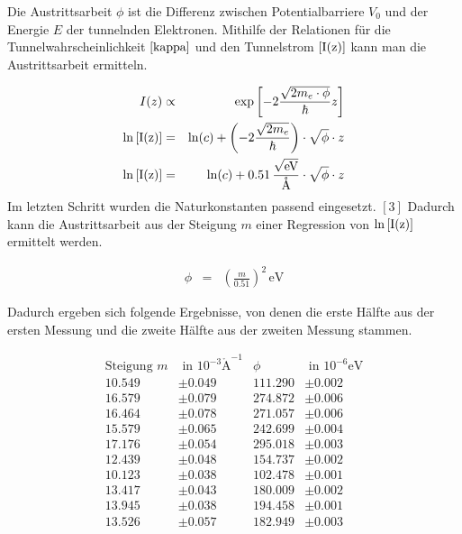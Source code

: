\documentclass[12pt,a4paper]{scrartcl}
\numberwithin{equation}{section} %
\renewcommand{\[}{} %
\renewcommand{\]}{\noindent} %
\begin{document}
Die Austrittsarbeit \(\phi\) ist die Differenz zwischen
Potentialbarriere \(V_0\) und der Energie \(E\) der tunnelnden
Elektronen. Mithilfe der Relationen für die Tunnelwahrscheinlichkeit
\(\eqref{kappa}\) und den Tunnelstrom \(\eqref{I(z)}\) kann man die
Austrittsarbeit ermitteln.

\[
\begin{eqnarray}
    I(z) &\propto& \exp\left[-2\frac{\sqrt{2m_e\cdot \phi}}{\hbar} z\right] \\
    \ln\eqref{I(z)}
        &=& \ln(c)
            + \left(-2\frac{\sqrt{2m_e}}{\hbar}\right)
            \cdot \sqrt{\phi} \cdot z \\
    \ln\eqref{I(z)} &=& \ln(c) + 0.51 \mathrm{\,\frac{\sqrt{eV}}{\mathrm{\mathring{A}}}}\cdot \sqrt{\phi} \cdot z
\end{eqnarray}
\] Im letzten Schritt wurden die Naturkonstanten passend eingesetzt.
\([3]\) Dadurch kann die Austrittsarbeit aus der Steigung \(m\) einer
Regression von \(\ln\eqref{I(z)}\) ermittelt werden.

\[
\begin{eqnarray}
    \phi &=& \left(\frac{m}{0.51}\right)^2 \mathrm{\,eV}
\end{eqnarray}
\]

Dadurch ergeben sich folgende Ergebnisse, von denen die erste Hälfte aus
der ersten Messung und die zweite Hälfte aus der zweiten Messung
stammen.

\[
\begin{align*}
    \text{Steigung } m &\text{ in } 10^{-3}\mathrm{\mathring A}^{-1}
        & \phi &\text{ in } 10^{-6}\mathrm{eV} \\
    10.549 &\pm 0.049 & 111.290 &\pm 0.002 \\
    16.579 &\pm 0.079 & 274.872 &\pm 0.006 \\
    16.464 &\pm 0.078 & 271.057 &\pm 0.006 \\
    15.579 &\pm 0.065 & 242.699 &\pm 0.004 \\
    17.176 &\pm 0.054 & 295.018 &\pm 0.003 \\
    12.439 &\pm 0.048 & 154.737 &\pm 0.002 \\
    10.123 &\pm 0.038 & 102.478 &\pm 0.001 \\
    13.417 &\pm 0.043 & 180.009 &\pm 0.002 \\
    13.945 &\pm 0.038 & 194.458 &\pm 0.001 \\
    13.526 &\pm 0.057 & 182.949 &\pm 0.003
\end{align*}
\]
\end{document}
